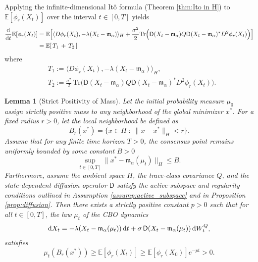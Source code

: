 \documentclass[12pt]{amsart}
\newcommand{\D}[1]{\mbox{\rm #1}}
\newcommand{\dd}{\D{d}}
\numberwithin{equation}{section}
\newtheorem{lemma}[theorem]{Lemma}
\begin{document}
Applying the infinite-dimensional It\^o formula (Theorem \ref{thm:Ito in H}) to $\mathbb{E}[\phi_r(X_t)]$ over the interval $t \in [0,T]$ yields 
\begin{equation*} 
\begin{aligned}
    \frac{\dd}{\dd t} \mathbb{E}[\phi_r(X_t)] 
    & = \mathbb{E}\Big[  \langle D\phi_r(X_t), -\lambda(X_t - \mathfrak{m}_{\alpha}) \rangle_H +  \frac{\sigma^2}{2} \mathrm{Tr}\Big( \mathsf{D}(X_t - \mathfrak{m}_{\alpha}) Q \mathsf{D}(X_t - \mathfrak{m}_{\alpha})^* D^2\phi_r(X_t) \Big)  \Big]\\
    & = \mathbb{E}[\,T_1 \, + \, T_2\,]
\end{aligned}
\end{equation*}
where
\begin{align*}
    & T_1 := \langle D\phi_r(X_t), -\lambda(X_t - \mathfrak{m}_{\alpha}) \rangle_H,\\
    & T_2 := \frac{\sigma^2}{2} \,\mathrm{Tr}\Big( \mathsf{D}(X_t - \mathfrak{m}_{\alpha}) Q \mathsf{D}(X_t - \mathfrak{m}_{\alpha})^* D^2\phi_r(X_t) \Big).
\end{align*}



\begin{lemma}[Strict Positivity of Mass] \label{lem:positive_mass_degenerate}
Let the initial probability measure $\mu_0$ assign strictly positive mass to any neighborhood of the global minimizer $x^*$. For a fixed radius $r > 0$, let the local neighborhood be defined as 
\[
    B_r(x^*) = \{x \in H \;:\; \|x - x^*\|_H < r\}.
\]
Assume that for any finite time horizon $T > 0$, the consensus point remains uniformly bounded by some constant $B>0$ 
\[
    \sup\limits_{t \in [0,T]} \|x^* - \mathfrak{m}_{\alpha}(\mu_t)\|_H \leq B.
\]
Furthermore, assume the ambient space $H$, the trace-class covariance $Q$, and the state-dependent diffusion operator $\mathsf{D}$ satisfy the active-subspace and regularity conditions outlined in Assumption \ref{assump:active_subspace} and in Proposition \ref{prop:diffusion}. Then there exists a strictly positive constant $p > 0$ such that for all $t \in [0,T]$, the law $\mu_t$ of the CBO dynamics 
\[
    \dd X_t = -\lambda (X_t - \mathfrak{m}_{\alpha}(\mu_t))\,\dd t + \sigma\, \mathsf{D}(X_t - \mathfrak{m}_{\alpha}(\mu_t))\,\dd W_t^Q,
\] 
satisfies
\begin{equation*}
    \mu_t(B_r(x^*)) \geq \mathbb{E}[\phi_r(X_t)] \geq \mathbb{E}[\phi_r(X_0)] e^{-pt} > 0.
\end{equation*}
\end{lemma}
\end{document}
